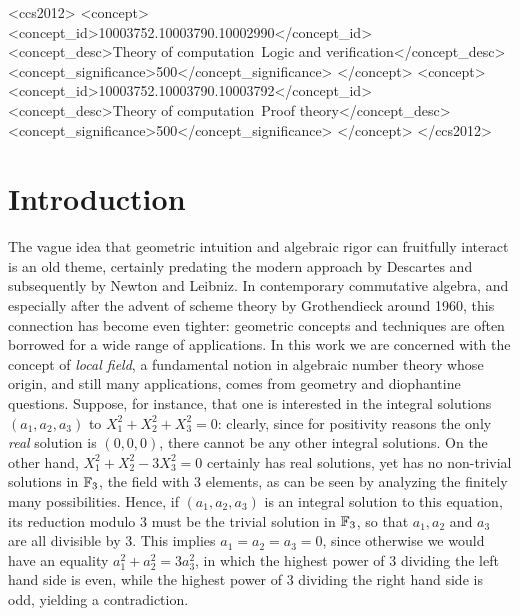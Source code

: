 \documentclass[sigplan,screen]{acmart}
\begin{document}
\begin{CCSXML}
	<ccs2012>
	<concept>
	<concept_id>10003752.10003790.10002990</concept_id>
	<concept_desc>Theory of computation~Logic and verification</concept_desc>
	<concept_significance>500</concept_significance>
	</concept>
	<concept>
	<concept_id>10003752.10003790.10003792</concept_id>
	<concept_desc>Theory of computation~Proof theory</concept_desc>
	<concept_significance>500</concept_significance>
	</concept>
	</ccs2012>
\end{CCSXML}






\maketitle


\section{Introduction}\label{sec:intro}
The vague idea that geometric intuition and algebraic rigor can fruitfully interact is an old theme, certainly predating the modern approach by Descartes and subsequently by Newton and Leibniz. 
In contemporary commutative algebra, and especially
after the advent of scheme theory by Grothendieck around 1960, this connection has become even tighter: geometric concepts and techniques are often borrowed for a wide range of applications. In this work we are concerned with the concept of \emph{local field}, a fundamental notion in algebraic number theory whose origin, and still many applications, comes from geometry and diophantine questions. Suppose, for instance, that one is interested in the integral solutions $(a_1,a_2,a_3)$ to $X_1^2+X_2^2+X_3^2=0$: clearly, since for positivity reasons the only \emph{real} solution is $(0,0,0)$, there cannot be any other integral solutions. On the other hand, $X_1^2+ X_2^2-3X_3^2=0$ certainly has real solutions, yet has no non-trivial solutions in $\FF[3]$, the field with $3$ elements, as can be seen by analyzing the finitely many possibilities. Hence, if $(a_1,a_2,a_3)$ is an integral solution to this equation, its reduction modulo 3 must be the trivial solution in $\FF[3]$, so that $a_1, a_2$ and $a_3$ are all divisible by $3$. This implies $a_1 = a_2 = a_3 = 0$, since otherwise we would have an equality $a_1^2 + a_2^2 = 3a_3^2$, in which the highest power of $3$ dividing the left hand side is even, while the highest power of $3$ dividing the right hand side is odd, yielding a contradiction.
\end{document}
